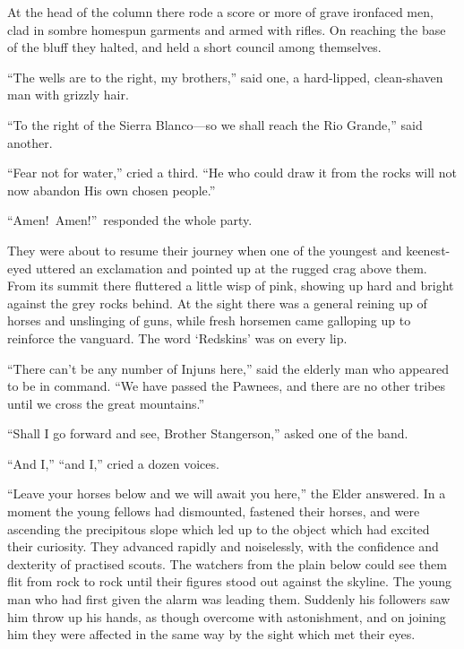 \documentclass[12pt,english,oneside]{book}
\newcommand{\mdsh}[1]{\mbox{#1}\linebreak[1]}
\begin{document}
At the head of the column there rode a score or more of grave ironfaced
men, clad in sombre homespun garments and armed with rifles. On reaching
the base of the bluff they halted, and held a short council among
themselves.

{}``The wells are to the right, my brothers,'' said one, a hard-lipped,
clean-shaven man with grizzly hair.

{}``To the right of the Sierra Blanco\mdsh{---}so we shall reach
the Rio Grande,'' said another.

{}``Fear not for water,'' cried a third. {}``He who could draw
it from the rocks will not now abandon His own chosen people.''

{}``Amen!\ Amen!''\ responded the whole party.

They were about to resume their journey when one of the youngest and
keenest-eyed uttered an exclamation and pointed up at the rugged crag
above them. From its summit there fluttered a little wisp of pink,
showing up hard and bright against the grey rocks behind. At the sight
there was a general reining up of horses and unslinging of guns, while
fresh horsemen came galloping up to reinforce the vanguard. The word
`Redskins' was on every lip.

{}``There can't be any number of Injuns here,'' said the elderly
man who appeared to be in command. {}``We have passed the Pawnees,
and there are no other tribes until we cross the great mountains.''

{}``Shall I go forward and see, Brother Stangerson,'' asked one
of the band.

{}``And I,'' {}``and I,'' cried a dozen voices.

{}``Leave your horses below and we will await you here,'' the Elder
answered. In a moment the young fellows had dismounted, fastened their
horses, and were ascending the precipitous slope which led up to the
object which had excited their curiosity. They advanced rapidly and
noiselessly, with the confidence and dexterity of practised scouts.
The watchers from the plain below could see them flit from rock to
rock until their figures stood out against the skyline. The young
man who had first given the alarm was leading them. Suddenly his followers
saw him throw up his hands, as though overcome with astonishment,
and on joining him they were affected in the same way by the sight
which met their eyes.
\end{document}
